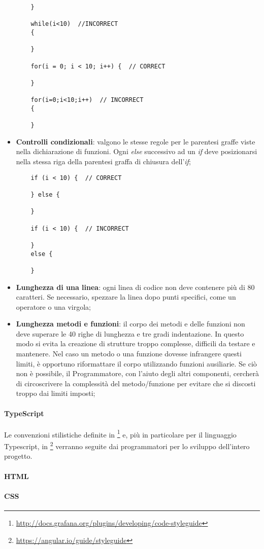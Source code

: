 \begin{itemize}
{\begin{lstlisting}
	}
	
	while(i<10)  //INCORRECT
	{  
	
	}
	
	for(i = 0; i < 10; i++) {  // CORRECT
		
	}
	
	for(i=0;i<10;i++)  // INCORRECT
	{  
	
	}
	\end{lstlisting}	
	}

	\item{\textbf{Controlli condizionali}: valgono le stesse regole per le parentesi graffe viste nella dichiarazione di funzioni. Ogni \emph{else} successivo ad un \emph{if} deve posizionarsi nella stessa riga della parentesi graffa di chiusura dell'\emph{if};}
	\begin{lstlisting}
	if (i < 10) {  // CORRECT
	
	} else {
	
	}
	
	if (i < 10) {  // INCORRECT  
	
	} 
	else {
	
	}
	\end{lstlisting}	
	
	\item{\textbf{Lunghezza di una linea}: ogni linea di codice non deve contenere più di 80 caratteri. Se necessario, spezzare la linea dopo punti specifici, come un operatore o una virgola;}
	
	\item{\textbf{Lunghezza metodi e funzioni}: il corpo dei metodi e delle funzioni non deve superare le 40 righe di lunghezza e tre gradi indentazione. In questo modo si evita la creazione di strutture troppo complesse, difficili da testare e mantenere. Nel caso un metodo o una funzione dovesse infrangere questi limiti, è opportuno riformattare il corpo utilizzando funzioni ausiliarie. Se ciò non è possibile, il Programmatore, con l'aiuto degli altri componenti, cercherà di circoscrivere la complessità del metodo/funzione per evitare che si discosti troppo dai limiti imposti;}
	
	
\end{itemize}


\paragraph{TypeScript}\Spazio
Le convenzioni stilistiche definite in \footnote{\url{http://docs.grafana.org/plugins/developing/code-styleguide}} e, più in particolare per il linguaggio Typescript, in \footnote{\url{https://angular.io/guide/styleguide}} verranno seguite dai programmatori per lo sviluppo dell'intero progetto.
\paragraph{HTML}\Spazio
\paragraph{CSS}\Spazio

\pagebreak
